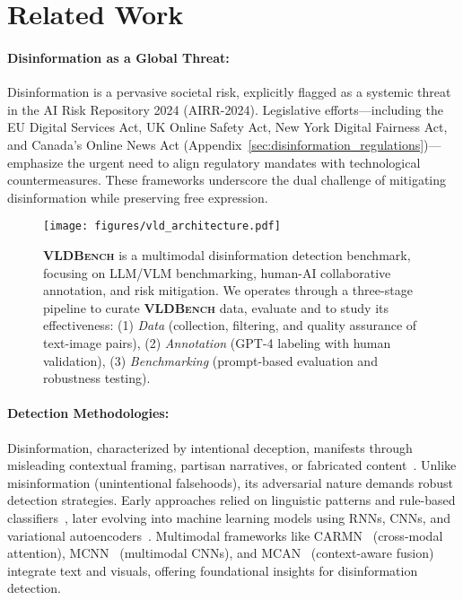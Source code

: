 
\section{Related Work}
\paragraph{Disinformation as a Global Threat:}
Disinformation is a pervasive societal risk, explicitly flagged as a systemic threat in the AI Risk Repository 2024 (AIRR-2024). Legislative efforts—including the EU Digital Services Act, UK Online Safety Act, New York Digital Fairness Act, and Canada’s Online News Act (Appendix~\ref{sec:disinformation_regulations})—emphasize the urgent need to align regulatory mandates with technological countermeasures. These frameworks underscore the dual challenge of mitigating disinformation while preserving free expression.
\begin{figure*}[ht]
    \centering
    \texttt{[image: figures/vld\_architecture.pdf]}
    
\caption{\textsf{\textbf{\textsc{VLDBench}}} is a multimodal disinformation detection benchmark, focusing on LLM/VLM benchmarking, human-AI collaborative annotation, and risk mitigation. We operates through a three-stage pipeline to curate \textsf{\textbf{\textsc{VLDBench}}} data, evaluate and to study its effectiveness:  
(1) \emph{Data} (collection, filtering, and quality assurance of text-image pairs),  
(2) \emph{Annotation} (GPT-4 labeling with human validation),  
(3) \emph{Benchmarking} (prompt-based evaluation and robustness testing).}  
    \vspace{-1em}
    \label{fig:vlbias}
\end{figure*}
\paragraph{Detection Methodologies:}
Disinformation, characterized by intentional deception, manifests through misleading contextual framing, partisan narratives, or fabricated content~\cite{hivemind_disinformation}. Unlike misinformation (unintentional falsehoods), its adversarial nature demands robust detection strategies. Early approaches relied on linguistic patterns and rule-based classifiers~\cite{rubin2016fake}, later evolving into machine learning models using RNNs, CNNs, and variational autoencoders~\cite{bahad2019fake,khattar2019mvae}. Multimodal frameworks like CARMN~\cite{song2021multimodal} (cross-modal attention), MCNN~\cite{segura2022multimodal} (multimodal CNNs), and MCAN~\cite{wu2021multimodal} (context-aware fusion) integrate text and visuals, offering foundational insights for disinformation detection.

